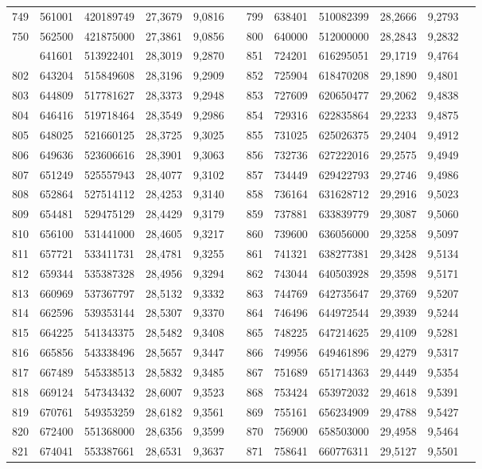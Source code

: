 \begin{longtable}{p{.17\linewidth}*{11}{S}}
749&561001&420189749&27,3679&9,0816&&799&638401&510082399&28,2666&9,2793\\
750&562500&421875000&27,3861&9,0856&&800&640000&512000000&28,2843&9,2832\\
&641601&513922401&28,3019&9,2870&&851&724201&616295051&29,1719&9,4764\\
802&643204&515849608&28,3196&9,2909&&852&725904&618470208&29,1890&9,4801\\
803&644809&517781627&28,3373&9,2948&&853&727609&620650477&29,2062&9,4838\\
804&646416&519718464&28,3549&9,2986&&854&729316&622835864&29,2233&9,4875\\
805&648025&521660125&28,3725&9,3025&&855&731025&625026375&29,2404&9,4912\\
806&649636&523606616&28,3901&9,3063&&856&732736&627222016&29,2575&9,4949\\
807&651249&525557943&28,4077&9,3102&&857&734449&629422793&29,2746&9,4986\\
808&652864&527514112&28,4253&9,3140&&858&736164&631628712&29,2916&9,5023\\
809&654481&529475129&28,4429&9,3179&&859&737881&633839779&29,3087&9,5060\\
810&656100&531441000&28,4605&9,3217&&860&739600&636056000&29,3258&9,5097\\
811&657721&533411731&28,4781&9,3255&&861&741321&638277381&29,3428&9,5134\\
812&659344&535387328&28,4956&9,3294&&862&743044&640503928&29,3598&9,5171\\
813&660969&537367797&28,5132&9,3332&&863&744769&642735647&29,3769&9,5207\\
814&662596&539353144&28,5307&9,3370&&864&746496&644972544&29,3939&9,5244\\
815&664225&541343375&28,5482&9,3408&&865&748225&647214625&29,4109&9,5281\\
816&665856&543338496&28,5657&9,3447&&866&749956&649461896&29,4279&9,5317\\
817&667489&545338513&28,5832&9,3485&&867&751689&651714363&29,4449&9,5354\\
818&669124&547343432&28,6007&9,3523&&868&753424&653972032&29,4618&9,5391\\
819&670761&549353259&28,6182&9,3561&&869&755161&656234909&29,4788&9,5427\\
820&672400&551368000&28,6356&9,3599&&870&756900&658503000&29,4958&9,5464\\
821&674041&553387661&28,6531&9,3637&&871&758641&660776311&29,5127&9,5501\\

\end{longtable}

